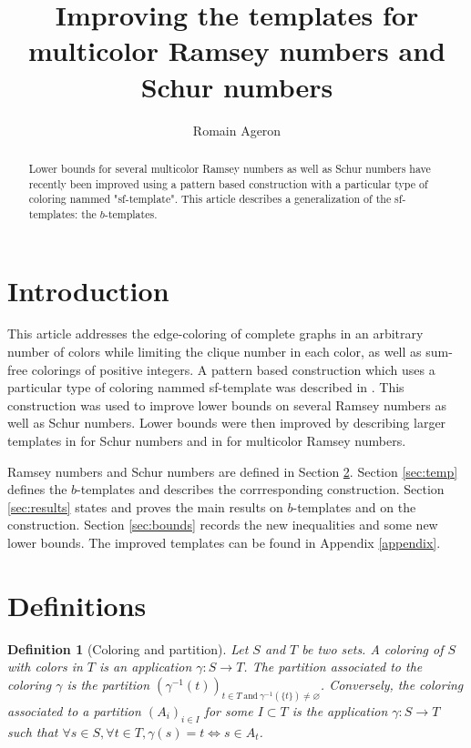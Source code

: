 \documentclass{article}
\title{Improving the templates for multicolor Ramsey numbers and Schur numbers}
\author{Romain Ageron}
\newtheorem{definition}{Definition}[section]
\begin{document}
\maketitle

\begin{abstract}
Lower bounds for several multicolor Ramsey numbers as well as Schur numbers have recently been improved using a 
pattern based construction with a particular type of coloring nammed "sf-template". This article describes a 
generalization of the sf-templates: the \(b\)-templates.
\end{abstract}

\section{Introduction}

This article addresses the edge-coloring of complete graphs in an arbitrary number of colors while limiting the clique 
number in each color, as well as sum-free colorings of positive integers. A pattern based construction which uses a 
particular type of coloring nammed sf-template was described in \cite{RowleyRamsey}. This construction was used to 
improve lower bounds on several Ramsey numbers as well as Schur numbers. Lower bounds were then improved by describing 
larger templates in \cite{schurboyz} for Schur numbers and in \cite{rowleyramseysat} for multicolor Ramsey numbers.

Ramsey numbers and Schur numbers are defined in Section \ref{sec:def}. Section \ref{sec:temp} defines the 
\(b\)-templates and describes the corrresponding construction. Section \ref{sec:results} states and proves the main 
results on \(b\)-templates and on the construction. Section \ref{sec:bounds} records the new inequalities and some new 
lower bounds. The improved templates can be found in Appendix \ref{appendix}.

\section{Definitions}
\label{sec:def}

\begin{definition}[Coloring and partition]
Let \(S\) and \(T\) be two sets. A coloring of \(S\) with colors in \(T\) is an application 
\(\gamma: S \rightarrow T\). The partition associated to the coloring \(\gamma\) is the partition 
\((\gamma^{-1}(t))_{t \in T ~\text{and}~ \gamma^{-1}(\{t\}) \neq \varnothing}\). Conversely, the coloring associated to 
a partition \((A_i)_{i \in I}\) for some \(I \subset T\) is the application \(\gamma: S \rightarrow T\) such that 
\(\forall s \in S, \forall t \in T, \gamma(s) = t \iff s \in A_t\).
\end{definition}
\end{document}
